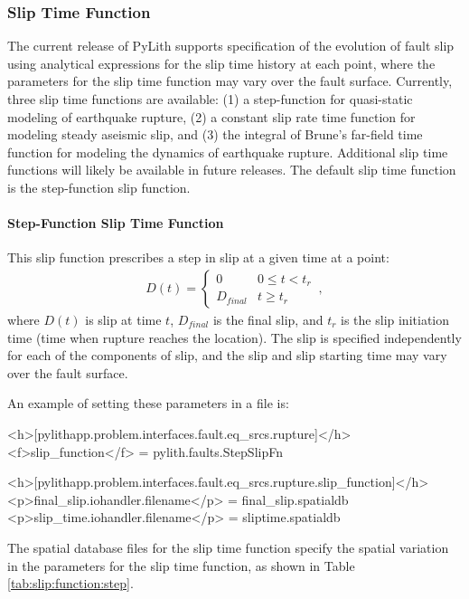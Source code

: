 \subsubsection{Slip Time Function}

The current release of PyLith supports specification of the evolution
of fault slip using analytical expressions for the slip time history
at each point, where the parameters for the slip time function may
vary over the fault surface. Currently, three slip time functions
are available: (1) a step-function for quasi-static modeling of earthquake
rupture, (2) a constant slip rate time function for modeling steady
aseismic slip, and (3) the integral of Brune's far-field time function
\cite{Brune:1970} for modeling the dynamics of earthquake rupture.
Additional slip time functions will likely be available in future
releases. The default slip time function is the step-function slip
function.


\paragraph{Step-Function Slip Time Function}

This slip function prescribes a step in slip at a given time at a
point: 
\begin{gather}
D(t)=\left\{ \begin{array}{cc}
0 & 0\leq t<t_{r}\\
D_{final} & t\ge t_{r}
\end{array}\right.\,,
\end{gather}
where $D(t)$ is slip at time $t$, $D_{final}$ is the final slip,
and $t_{r}$ is the slip initiation time (time when rupture reaches
the location). The slip is specified independently for each of the
components of slip, and the slip and slip starting time may vary over
the fault surface.
\begin{inventory}
\end{inventory}
An example of setting these parameters in a  file is:
\begin{cfg}
<h>[pylithapp.problem.interfaces.fault.eq_srcs.rupture]</h>
<f>slip_function</f> = pylith.faults.StepSlipFn 

<h>[pylithapp.problem.interfaces.fault.eq_srcs.rupture.slip_function]</h>
<p>final_slip.iohandler.filename</p> = final_slip.spatialdb
<p>slip_time.iohandler.filename</p> = sliptime.spatialdb
\end{cfg}
The spatial database files for the slip time function specify the
spatial variation in the parameters for the slip time function, as
shown in Table \vref{tab:slip:function:step}.

